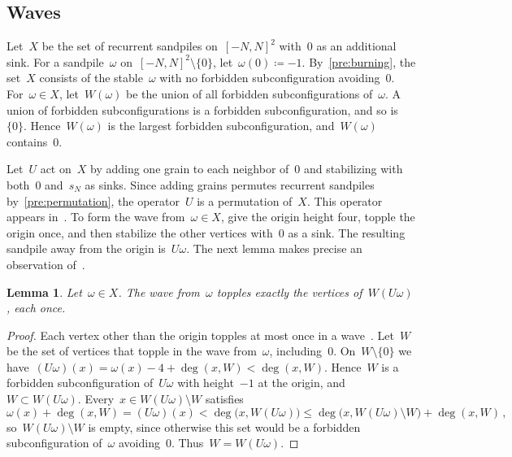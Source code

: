 \documentclass[11pt]{amsart}
\numberwithin{equation}{section}
\newtheorem{lemma}[equation]{Lemma}
\begin{document}
\subsection{Waves}\label{ssec:waves}

Let~$X$ be the set of recurrent sandpiles on~$[-N,N]^2$ with~$0$ as an additional sink. For a sandpile~$\omega$ on~$[-N,N]^2\setminus\{0\}$, let~$\omega(0)\coloneqq-1$. By~\eqref{pre:burning}, the set~$X$ consists of the stable~$\omega$ with no forbidden subconfiguration avoiding~$0$. For~$\omega\in X$, let~$W(\omega)$ be the union of all forbidden subconfigurations of~$\omega$. A union of forbidden subconfigurations is a forbidden subconfiguration, and so is~$\{0\}$. Hence~$W(\omega)$ is the largest forbidden subconfiguration, and~$W(\omega)$ contains~$0$.

Let~$U$ act on~$X$ by adding one grain to each neighbor of~$0$ and stabilizing with both~$0$ and~$s_N$ as sinks. Since adding grains permutes recurrent sandpiles by~\eqref{pre:permutation}, the operator~$U$ is a permutation of~$X$. This operator appears in~\citet[equations~(7.1) and~(7.3)]{JaraiRedig2008}. To form the wave from~$\omega\in X$, give the origin height four, topple the origin once, and then stabilize the other vertices with~$0$ as a sink. The resulting sandpile away from the origin is~$U\omega$. The next lemma makes precise an observation of~\citet*[Section~2]{IvashkevichKtitarevPriezzhev1994}.

\begin{lemma}\label{fv:inverse-waves}
Let~$\omega\in X$. The wave from~$\omega$ topples exactly the vertices of~$W(U\omega)$, each once.
\end{lemma}

\begin{proof}
Each vertex other than the origin topples at most once in a wave~\citep*[Section~2.2]{BhupatirajuHansonJarai2017}. Let~$W$ be the set of vertices that topple in the wave from~$\omega$, including~$0$. On~$W\setminus\{0\}$ we have~$(U\omega)(x)=\omega(x)-4+\deg(x,W)<\deg(x,W)$. Hence~$W$ is a forbidden subconfiguration of~$U\omega$ with height~$-1$ at the origin, and~$W\subset W(U\omega)$. Every~$x\in W(U\omega)\setminus W$ satisfies
\begin{equation*}
 \omega(x)+\deg(x,W)=(U\omega)(x)<\deg\bigl(x,W(U\omega)\bigr)\leq\deg\bigl(x,W(U\omega)\setminus W\bigr)+\deg(x,W)\,,
\end{equation*}
so~$W(U\omega)\setminus W$ is empty, since otherwise this set would be a forbidden subconfiguration of~$\omega$ avoiding~$0$. Thus~$W=W(U\omega)$.
\end{proof}
\end{document}
